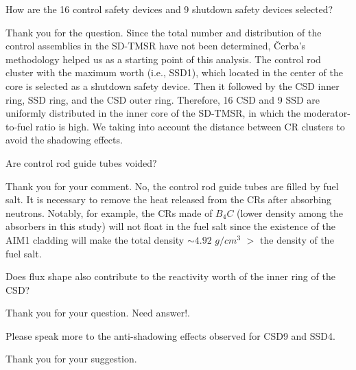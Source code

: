 \documentclass[answers,11pt]{exam}
\begin{document}
\begin{questions}
        \question  How are the 16 control safety devices and 9 shutdown safety devices selected?
        \begin{solution}
        	Thank you for the question. Since the total number and distribution of the control assemblies in the SD-TMSR have not been determined, \v{C}erba's methodology \cite{vcerba2017optimization} helped us as a starting point of this analysis. The control rod cluster with the maximum worth (i.e., SSD1), which located in the center of the core is selected as a shutdown safety device.
        	Then it followed by the CSD inner ring, SSD ring, and the CSD outer ring. Therefore, 16 CSD and 9 SSD are uniformly distributed in the inner core of the SD-TMSR, in which the moderator-to-fuel ratio is high. We taking into account the distance between CR clusters to avoid the shadowing effects.
        	

        \end{solution}

        \question Are control rod guide tubes voided?
        \begin{solution}
                Thank you for your comment. No, the control rod guide tubes are filled by fuel salt. It is necessary to remove the heat released from the CRs after absorbing neutrons. Notably, for example, the CRs made of $B_{4}C$ (lower density among the absorbers in this study) will not float in the fuel salt since the existence of the AIM1 cladding will make the total density $\sim 4.92$ $g/cm^3$ $>$ the density of the fuel salt.
                 
                
              
                
                
                

        \end{solution}

        \question Does flux shape also contribute to the reactivity worth of the inner ring of the CSD?
        \begin{solution}
                 Thank you for your question. Need answer!.

        \end{solution}

\question Please speak more to the anti-shadowing effects observed for CSD9 and SSD4.
\begin{solution}
	Thank you for your suggestion. 
	

\end{solution}
\end{questions}
\end{document}
